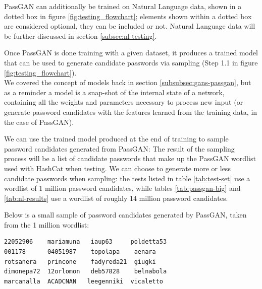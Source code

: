 PassGAN can additionally be trained on Natural Language data, shown in a dotted box in figure \ref{fig:testing_flowchart}; elements shown within a dotted box are considered optional, they can be included or not. Natural Language data will be further discussed in section \ref{subsec:nl-testing}.

Once PassGAN is done training with a given dataset, it produces a trained model that can be used to generate candidate passwords via sampling (Step 1.1 in figure \ref{fig:testing_flowchart}).\\ 
We covered the concept of models back in section \ref{subsubsec:gans-passgan}, but as a reminder a model is a snap-shot of the internal state of a network, containing all the weights and parameters necessary to process new input (or generate password candidates with the features learned from the training data, in the case of PassGAN).

We can use the trained model produced at the end of training to sample password candidates generated from PassGAN: The result of the sampling process will be a list of candidate passwords that make up the PassGAN wordlist used with HashCat when testing. We can choose to generate more or less candidate passwords when sampling: the tests listed in table \ref{tab:test-set} use a wordlist of 1 million password candidates, while tables \ref{tab:passgan-big} and \ref{tab:nl-results} use a wordlist of roughly 14 million password candidates.



Below is a small sample of password candidates generated by PassGAN, taken from the 1 million wordlist: %
\begin{verbatim}
22052906    mariamuna   iaup63     poldetta53
001178      04051987    topolapa    aenara
rotsanera   princone    fadyreda21  giugki
dimonepa72  12orlomon   deb57828    belnabola
marcanalla  ACADCNAN   leegenniki  vicaletto
\end{verbatim}

